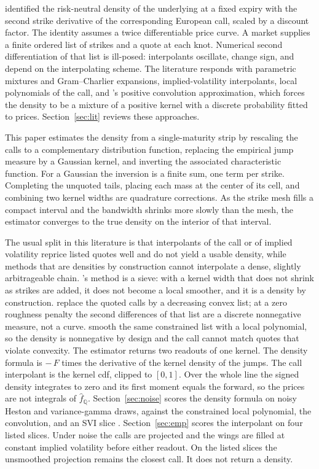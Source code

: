 \documentclass[preprint,12pt,authoryear,times]{elsarticle}
\newcommand{\Q}{\mathbb{Q}}
\begin{document}
\citet{breeden1978} identified the risk-neutral density of the underlying at a fixed expiry with the second strike derivative of the corresponding European call, scaled by a discount factor. The identity assumes a twice differentiable price curve. A market supplies a finite ordered list of strikes and a quote at each knot. Numerical second differentiation of that list is ill-posed: interpolants oscillate, change sign, and depend on the interpolating scheme. The literature responds with parametric mixtures and Gram--Charlier expansions, implied-volatility interpolants, local polynomials of the call, and \citet{bondarenko2003}'s positive convolution approximation, which forces the density to be a mixture of a positive kernel with a discrete probability fitted to prices. Section~\ref{sec:lit} reviews these approaches.

This paper estimates the density from a single-maturity strip by rescaling the calls to a complementary distribution function, replacing the empirical jump measure by a Gaussian kernel, and inverting the associated characteristic function. For a Gaussian the inversion is a finite sum, one term per strike. Completing the unquoted tails, placing each mass at the center of its cell, and combining two kernel widths are quadrature corrections. As the strike mesh fills a compact interval and the bandwidth shrinks more slowly than the mesh, the estimator converges to the true density on the interior of that interval.

The usual split in this literature is that interpolants of the call or of implied volatility reprice listed quotes well and do not yield a usable density, while methods that are densities by construction cannot interpolate a dense, slightly arbitrageable chain. \citeauthor{bondarenko2003}'s method is a sieve: with a kernel width that does not shrink as strikes are added, it does not become a local smoother, and it is a density by construction. \citet{yatchew2006} replace the quoted calls by a decreasing convex list; at a zero roughness penalty the second differences of that list are a discrete nonnegative measure, not a curve. \citet{aitsahalia2003} smooth the same constrained list with a local polynomial, so the density is nonnegative by design and the call cannot match quotes that violate convexity. The estimator returns two readouts of one kernel. The density formula is \(-\,F\) times the derivative of the kernel density of the jumps. The call interpolant is the kernel cdf, clipped to \([0,1]\). Over the whole line the signed density integrates to zero and its first moment equals the forward, so the prices are not integrals of \(\hat f_{\Q}\). Section~\ref{sec:noise} scores the density formula on noisy Heston and variance-gamma draws, against the constrained local polynomial, the convolution, and an SVI slice \citep{gatheral2006,gatheraljacquier2014}. Section~\ref{sec:emp} scores the interpolant on four listed slices. Under noise the calls are projected and the wings are filled at constant implied volatility before either readout. On the listed slices the unsmoothed projection remains the closest call. It does not return a density. 
\end{document}

